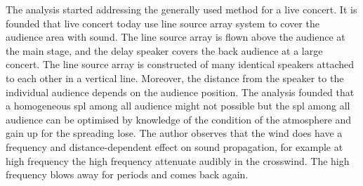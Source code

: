 The analysis started addressing the generally used method for a live concert. It is founded that live concert today use line source array system to cover the audience area with sound. The line source array is flown above the audience at the main stage, and the delay speaker covers the back audience at a large concert. The line source array is constructed of many identical speakers attached to each other in a vertical line. Moreover, the distance from the speaker to the individual audience depends on the audience position. The analysis founded that a homogeneous \gls{spl} among all audience might not possible but the \gls{spl} among all audience can be optimised by knowledge of the condition of the atmosphere and gain up for the spreading lose. The author observes that the wind does have a frequency and distance-dependent effect on sound propagation, for example at high frequency the high frequency attenuate audibly in the crosswind. The high frequency blows away for periods and comes back again. 
